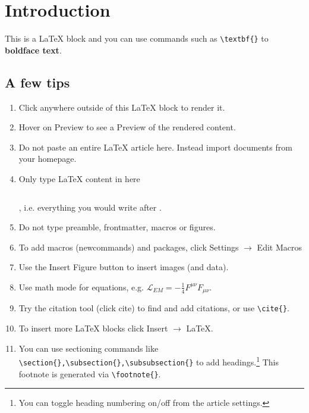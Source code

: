 \section{Introduction}

This is a LaTeX block and you can use commands such as \verb|\textbf{}| to \textbf{boldface text}.

\subsection{A few tips}

\begin{enumerate}
\item Click anywhere outside of this LaTeX block to render it.
\item Hover on Preview to see a Preview of the rendered content.
\item Do not paste an entire LaTeX article here. Instead import documents from your homepage.
\item Only type LaTeX content in here\begin{verbatim}

\end{verbatim}, i.e. everything you would write after \verb||.
\item Do not type preamble, frontmatter, macros or figures.
\item To add macros (newcommands) and packages, click Settings $\rightarrow$ Edit Macros
\item Use the Insert Figure button to insert images (and data).
\item Use math mode for equations, e.g. $\mathcal L_{EM}=-\frac14F^{\mu\nu}F_{\mu\nu}$.
\item Try the citation tool (click cite) to find and add citations, or use \verb|\cite{}|.
\item To insert more LaTeX blocks click Insert $\rightarrow$ LaTeX.
\item You can use sectioning commands like \verb|\section{},\subsection{},\subsubsection{}| to add headings.\footnote{You can toggle heading numbering on/off from the article settings.} This footnote is generated via \verb|\footnote{}|.
\end{enumerate}